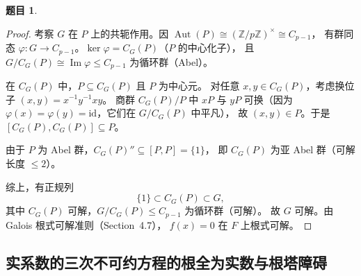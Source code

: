 \documentclass[a4paper]{ctexart}
\theoremstyle{definition}
\newtheorem{example}{题目}[section]
\theoremstyle{analysis}
\theoremstyle{plain}
\begin{document}
\begin{example}
\begin{proof}
考察 \(G\) 在 \(P\) 上的共轭作用。因
\(\operatorname{Aut}(P)\cong(\mathbb Z/p\mathbb Z)^\times\cong C_{p-1}\)，
有群同态 \(\varphi:G\to C_{p-1}\)。\(\ker\varphi=C_G(P)\)（\(P\) 的中心化子），
且 \(G/C_G(P)\cong\operatorname{Im}\varphi\le C_{p-1}\) 为循环群（Abel）。

在 \(C_G(P)\) 中，\(P\subseteq C_G(P)\) 且 \(P\) 为中心元。
对任意 \(x,y\in C_G(P)\)，考虑换位子 \((x,y)=x^{-1}y^{-1}xy\)。
商群 \(C_G(P)/P\) 中 \(xP\) 与 \(yP\) 可换（因为
\(\varphi(x)=\varphi(y)=\mathrm{id}\)，它们在 \(G/C_G(P)\) 中平凡），
故 \((x,y)\in P\)。于是 \([C_G(P),C_G(P)]\subseteq P\)。

由于 \(P\) 为 Abel 群，\(C_G(P)''\subseteq[P,P]=\{1\}\)，
即 \(C_G(P)\) 为亚 Abel 群（可解长度 \(\le2\)）。

综上，有正规列
\[
  \{1\}\subset C_G(P)\subset G,
\]
其中 \(C_G(P)\) 可解，\(G/C_G(P)\le C_{p-1}\) 为循环群（可解）。
故 \(G\) 可解。由 Galois 根式可解准则（Section~4.7），
\(f(x)=0\) 在 \(F\) 上根式可解。
\end{proof}
\end{example}

\subsection{\texorpdfstring{实系数的三次不可约方程的根全为实数与根塔障碍}{实系数三次方程的根全实与根塔障碍}}\label{subsec:problem-real-cubic-radical}
\end{document}
